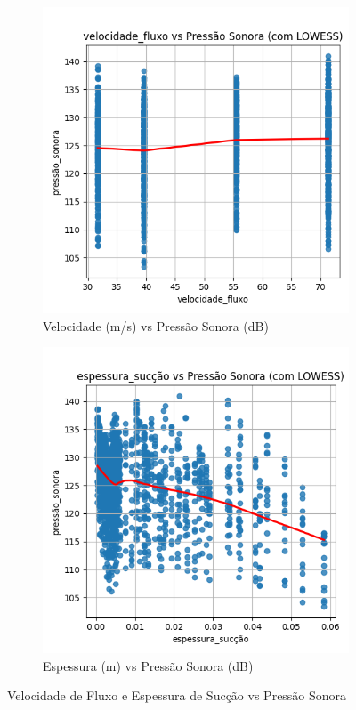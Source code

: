 \documentclass[12pt,a4paper,oneside]{report}
\begin{document}
\begin{figure}[H]
	\begin{subfigure}{0.5\textwidth}
	\centering
	\includegraphics[width=\linewidth]{img/t1_disperssao_lowess_velocidade_fluxo}
	\caption{Velocidade (m/s) vs Pressão Sonora (dB)}
	\label{fig:t1disperssaolowessvelocidadefluxo}
		\end{subfigure} 
\begin{subfigure}{0.5\textwidth}
	\centering
	\includegraphics[width=\linewidth]{img/t1_disperssao_lowess_espessura_sucção}
	\caption{Espessura  (m) vs Pressão Sonora (dB)}
	\label{fig:t1disperssaolowessespessurasuccao}
\end{subfigure}
\caption{Velocidade de Fluxo e Espessura de Sucção vs Pressão Sonora}
\end{figure}
\end{document}

